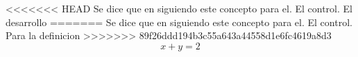 \documentclass[11pt,a4paper]{book}
\begin{document}
<<<<<<< HEAD
 Se dice que  en \cite{khalil:2002} siguiendo este concepto para el. El control.
  El desarrollo
=======
 Se dice que  en \cite{khalil:2002} siguiendo este concepto para el. El control. Para la definicion
>>>>>>> 89f26ddd194b3c55a643a44558d1e6fc4619a8d3
\begin{equation}
    x+y=2
\end{equation}


\end{document}
